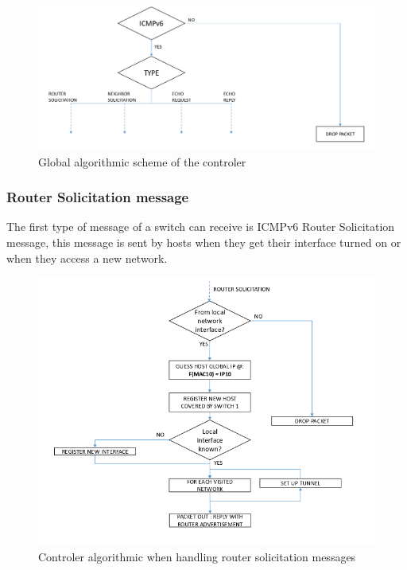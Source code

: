 \documentclass{article}
\begin{document}
\begin{figure}[h!]
  \centering
    \includegraphics[scale=0.3]{reportPictures/controller_global_algo.png}
  \caption{Global algorithmic scheme of the controler}
\end{figure}

\subsubsection{Router Solicitation message}

The first type of message of a switch can receive is ICMPv6 Router
Solicitation message, this message is sent by hosts when they get their
interface turned on or when they access a new network.\\ 

\begin{figure}[h!]
  \centering
    \includegraphics[scale=0.3]{reportPictures/router_solicitation.png}
  \caption{Controler algorithmic when handling router solicitation messages}
\end{figure}
\end{document}

